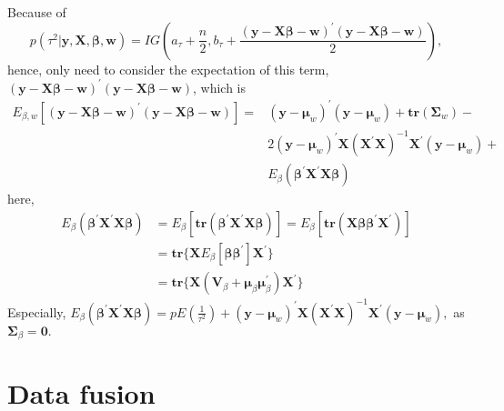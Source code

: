 \documentclass[
]{article}
\begin{document}
Because of \begin{equation}
p\left(\tau^{2} | \boldsymbol{y}, \boldsymbol{X}, \boldsymbol{\beta}, \boldsymbol{w}\right)=I G\left(a_{\tau}+\frac{n}{2}, b_{\tau}+\frac{(\boldsymbol{y}-\boldsymbol{X} \boldsymbol{\beta}-\boldsymbol{w})^{\prime}(\boldsymbol{y}-\boldsymbol{X} \boldsymbol{\beta}-\boldsymbol{w})}{2}\right),
\end{equation} hence, only need to consider the expectation of this
term,
\((\boldsymbol{y}-\boldsymbol{X} \boldsymbol{\beta}-\boldsymbol{w})^{\prime}(\boldsymbol{y}-\boldsymbol{X} \boldsymbol{\beta}-\boldsymbol{w})\),
which is
\[\begin{aligned} E_{\beta,w}[(\boldsymbol{y}-\boldsymbol{X} \boldsymbol{\beta}-\boldsymbol{w})^{\prime}(\boldsymbol{y}-\boldsymbol{X} \boldsymbol{\beta}-\boldsymbol{w})]
= &(\bm{y} - \bm{\mu}_w)^\prime(\bm{y} - \bm{\mu}_w) + \textbf{tr}(\bm{\Sigma}_w) -  \\
& 2(\bm{y} - \bm{\mu}_w)^\prime\bm{X}(\bm{X}^\prime\bm{X})^{-1}\bm{X}^\prime(\bm{y} - \bm{\mu}_w) + \\
& E_\beta(\bm{\beta}^\prime\bm{X}^\prime \bm{X}\bm{\beta})
\end{aligned}
\] here, \[
\begin{aligned}
  E_\beta(\bm{\beta}^\prime\bm{X}^\prime \bm{X}\bm{\beta}) &=  E_\beta[\textbf{tr}(\bm{\beta}^\prime\bm{X}^\prime \bm{X}\bm{\beta})]
= E_\beta[\textbf{tr}(\bm{X}\bm{\beta} \bm{\beta}^\prime\bm{X}^\prime )]\\
& = \textbf{tr}\{\bm{X}E_\beta[\bm{\beta} \bm{\beta}^\prime]\bm{X}^\prime \}\\
& = \textbf{tr}\{\bm{X} (\bm{V}_\beta + \bm{\mu}_\beta \bm{\mu}_\beta^\prime )\bm{X}^\prime \}
\end{aligned}
\] Especially,
\(E_\beta(\bm{\beta}^\prime\bm{X}^\prime \bm{X}\bm{\beta}) = pE(\frac{1}{\tau^2}) + (\bm{y} - \bm{\mu}_w)^\prime\bm{X}(\bm{X}^\prime\bm{X})^{-1}\bm{X}^\prime(\bm{y} - \bm{\mu}_w),\)
as \(\bm{\Sigma}_\beta = \bm{0}.\)

\hypertarget{data-fusion}{%
\section{Data fusion}\label{data-fusion}}
\end{document}
